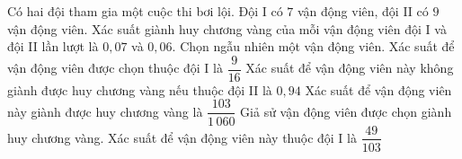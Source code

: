 \begin{ex}%
	Có hai đội tham gia một cuộc thi bơi lội. Đội I có $7$ vận động viên, đội II có  $9$ vận động viên. Xác suất giành huy chương vàng của mỗi vận động viên đội I và đội II lần lượt là $0{,}07$ và $0{,}06$. Chọn ngẫu nhiên một vận động viên.
	 \choiceTF
		{Xác suất để vận động viên  được chọn thuộc đội I là $\dfrac{9}{16}$}
		{\True Xác suất để vận động viên này không giành được huy chương vàng nếu thuộc đội II  là $0{,}94$}
		{Xác suất để vận động viên này giành được huy chương  vàng là $\dfrac{103}{1\,060}$}
		{\True Giả sử vận động viên được chọn giành huy chương vàng. Xác suất để vận động  viên này thuộc đội I là $\dfrac{49}{103}$}
\end{ex}

